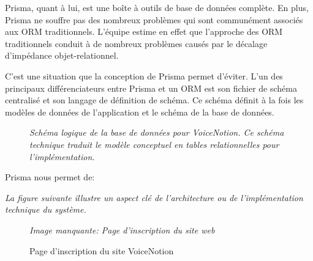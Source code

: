 Prisma, quant à lui, est une boîte à outils de base de données complète. En plus, Prisma ne souffre pas des nombreux problèmes qui sont communément associés aux ORM traditionnels. L'équipe estime en effet que l'approche des ORM traditionnels conduit à de nombreux problèmes causés par le décalage d'impédance objet-relationnel.

C'est une situation que la conception de Prisma permet d'éviter. L'un des principaux différenciateurs entre Prisma et un ORM est son fichier de schéma centralisé et son langage de définition de schéma. Ce schéma définit à la fois les modèles de données de l'application et le schéma de la base de données.

\begin{figure}[H]
\centering
\textit{Schéma logique de la base de données pour VoiceNotion. \newline\textit{Ce schéma technique traduit le modèle conceptuel en tables relationnelles pour l'implémentation.}}
\label{fig:prisma-schema}
\end{figure}

Prisma nous permet de:

\textit{La figure suivante illustre un aspect clé de l'architecture ou de l'implémentation technique du système.}
\begin{figure}[H]
\centering
\textit{Image manquante: Page d'inscription du site web}
\caption{Page d'inscription du site VoiceNotion}
\label{fig:web-signup}
\end{figure}

